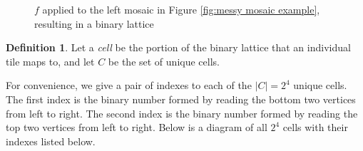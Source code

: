 \documentclass[12pt]{article}
\theoremstyle{plain}
\theoremstyle{definition}
\newtheorem{definition}{Definition}[section]
\theoremstyle{remark}
\theoremstyle{definition}
\begin{document}
\begin{figure}
\begin{center}
\begin{tikzpicture}
    \end{tikzpicture}
\end{center}
\caption{$f$ applied to the left mosaic in Figure \ref{fig:messy mosaic example}, resulting in a binary lattice}
\label{fig:example of f mapping}
\end{figure}

\begin{definition}
    Let a \textit{cell} be the portion of the binary lattice that an individual tile maps to, and let $C$ be the set of unique cells. 
\end{definition}

For convenience, we give a pair of indexes to each of the $|C| = 2^4$ unique cells. The first index is the binary number formed by reading the bottom two vertices from left to right. The second index is the binary number formed by reading the top two vertices from left to right. Below is a diagram of all $2^4$ cells with their indexes listed below.
\end{document}
